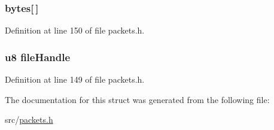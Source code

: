 \subsubsection[{bytes}]{ bytes\mbox{[}$\,$\mbox{]}}\label{struct_c_o_n_t_i_n_u_e___u_p_l_o_a_d___r_e_p_l_y_a1fdde1580342b6b1df0d8f5213c45107}


Definition at line 150 of file packets.\+h.

\hypertarget{struct_c_o_n_t_i_n_u_e___u_p_l_o_a_d___r_e_p_l_y_afdfd867e8243b0ae1e245e467179c567}{}
\subsubsection[{file\+Handle}]{ {\bf u8} file\+Handle}\label{struct_c_o_n_t_i_n_u_e___u_p_l_o_a_d___r_e_p_l_y_afdfd867e8243b0ae1e245e467179c567}


Definition at line 149 of file packets.\+h.



The documentation for this struct was generated from the following file\+:\begin{DoxyCompactItemize}
\item 
src/\hyperlink{packets_8h}{packets.\+h}\end{DoxyCompactItemize}
